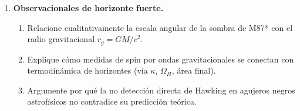\begin{enumerate}[leftmargin=2em, label=\textbf{P\thechapter.\arabic*.}]
  \item \textbf{Observacionales de horizonte fuerte.}
  \begin{enumerate}[label=(\alph*)]
    \item Relacione cualitativamente la escala angular de la sombra de M87* con el radio gravitacional $r_g=GM/c^2$.
    \item Explique cómo medidas de spin por ondas gravitacionales se conectan con termodinámica de horizontes (vía $\kappa$, $\Omega_H$, área final).
    \item Argumente por qué la no detección directa de Hawking en agujeros negros astrofísicos no contradice su predicción teórica.
  \end{enumerate}

\end{enumerate}
